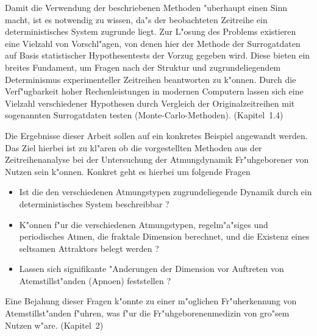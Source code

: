 Damit die Verwendung der beschriebenen Methoden "uberhaupt einen Sinn macht, ist es
notwendig zu wissen, da"s der beobachteten Zeitreihe ein deterministisches System zugrunde
liegt.  Zur L"osung des Problems existieren eine Vielzahl von Vorschl"agen, von denen hier
der Methode der Surrogatdaten auf Basis statistischer Hypothesentests der Vorzug gegeben
wird.  Diese bieten ein breites Fundament, um Fragen nach der Struktur und
zugrundeliegendem Determinismus experimenteller Zeitreihen beantworten zu k"onnen. Durch
die Verf"ugbarkeit hoher Rechenleistungen in modernen Computern lassen sich eine Vielzahl
verschiedener Hypothesen durch Vergleich der Originalzeitreihen mit sogenannten
Surrogatdaten testen (Monte-Carlo-Methoden). (Kapitel~1.4)

Die Ergebnisse dieser Arbeit sollen auf ein konkretes Beispiel angewandt werden. Das Ziel
hierbei ist zu kl"aren ob die vorgestellten Methoden aus der Zeitreihenanalyse bei der
Untersuchung der Atmungdynamik Fr"uhgeborener von Nutzen sein k"onnen.
Konkret geht es hierbei um folgende Fragen
\begin{itemize}
\item Ist die den verschiedenen Atmungstypen zugrundeliegende Dynamik durch ein
  deterministisches System beschreibbar ?
\item K"onnen f"ur die verschiedenen Atmungstypen, regelm"a"siges und periodisches Atmen, die
  fraktale Dimension berechnet, und  die Existenz eines seltsamen Attraktors belegt werden ?
\item Lassen sich signifikante "Anderungen der Dimension vor Auftreten von
  Atemstillst"an\-den (Apnoen) feststellen ?
\end{itemize}
Eine Bejahung dieser Fragen k"onnte zu einer m"oglichen Fr"uherkennung von
Atemstillst"anden f"uhren, was f"ur die Fr"uhgeborenenmedizin von gro"sem Nutzen w"are.
(Kapitel~2)





